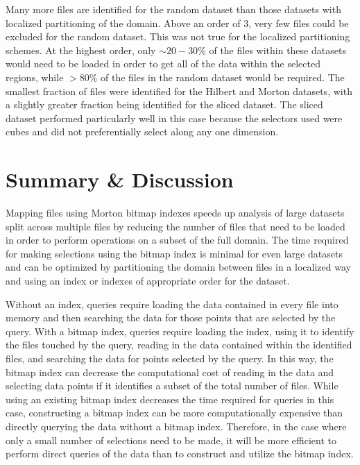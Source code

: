 \documentclass[apjl]{emulateapj}
\begin{document}
Many more files are identified for the random dataset than those datasets with localized partitioning of the domain. Above an order of 3, very few files could be excluded for the random dataset. This was not true for the localized partitioning schemes. At the highest order, only $\sim20-30$\% of the files within these datasets would need to be loaded in order to get all of the data within the selected regions, while $>80$\% of the files in the random dataset would be required. The smallest fraction of files were identified for the Hilbert and Morton datasets, with a slightly greater fraction being identified for the sliced dataset. The sliced dataset performed particularly well in this case because the selectors used were cubes and did not preferentially select along any one dimension.

\section{Summary \& Discussion}\label{S:discuss}
Mapping files using Morton bitmap indexes speeds up analysis of large datasets split across multiple files by reducing the number of files that need to be loaded in order to perform operations on a subset of the full domain. The time required for making selections using the bitmap index is minimal for even large datasets and can be optimized by partitioning the domain between files in a localized way and using an index or indexes of appropriate order for the dataset. 

Without an index, queries require loading the data contained in every file into memory and then searching the data for those points that are selected by the query. With a bitmap index, queries require loading the index, using it to identify the files touched by the query, reading in the data contained within the identified files, and searching the data for points selected by the query. In this way, the bitmap index can decrease the computational cost of reading in the data and selecting data points if it identifies a subset of the total number of files. While using an existing bitmap index decreases the time required for queries in this case, constructing a bitmap index can be more computationally expensive than directly querying the data without a bitmap index. Therefore, in the case where only a small number of selections need to be made, it will be more efficient to perform direct queries of the data than to construct and utilize the bitmap index.
\end{document}
